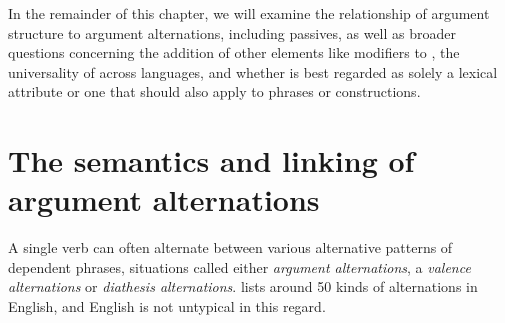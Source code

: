 \documentclass[output=paper
                ,modfonts
                ,nonflat
	        ,collection
	        ,collectionchapter
	        ,collectiontoclongg
 	        ,biblatex
                ,babelshorthands
                ,newtxmath
                ,draftmode
                ,colorlinks, citecolor=brown
]{./langsci/langscibook}
\begin{document}
In the remainder of this chapter, we will examine the relationship of argument structure to argument alternations, including passives, as well as broader questions concerning the addition of other elements like modifiers to \argst, the universality of \argst across languages, and whether \argst is best regarded as solely a lexical attribute or one that should also apply to phrases or constructions.


\section{The semantics and linking of argument alternations}
\label{alternations}
A single verb can often alternate between
 various alternative patterns of dependent phrases, situations called either 
\emph{argument alternations}, a
\emph{valence alternations} or \emph{diathesis alternations}.
\citet{Levin1993} lists around 50 kinds of alternations in English, and English is not untypical in this regard.

%
\end{document}
